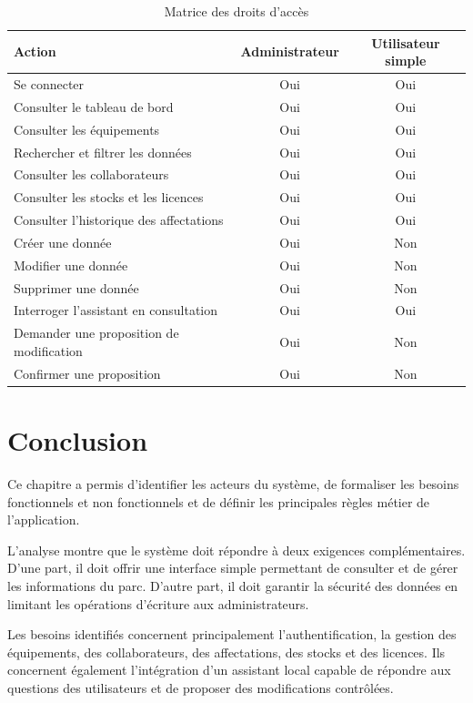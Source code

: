 \documentclass{rapportENSIAS}
\begin{document}
\begin{table}[htbp]
\centering
\caption{Matrice des droits d'accès}
\label{tab:droits-acces}
\begin{tabular}{|p{7cm}|c|c|}
\hline
\textbf{Action} & \textbf{Administrateur} & \textbf{Utilisateur simple} \\
\hline
Se connecter & Oui & Oui \\
\hline
Consulter le tableau de bord & Oui & Oui \\
\hline
Consulter les équipements & Oui & Oui \\
\hline
Rechercher et filtrer les données & Oui & Oui \\
\hline
Consulter les collaborateurs & Oui & Oui \\
\hline
Consulter les stocks et les licences & Oui & Oui \\
\hline
Consulter l'historique des affectations & Oui & Oui \\
\hline
Créer une donnée & Oui & Non \\
\hline
Modifier une donnée & Oui & Non \\
\hline
Supprimer une donnée & Oui & Non \\
\hline
Interroger l'assistant en consultation & Oui & Oui \\
\hline
Demander une proposition de modification & Oui & Non \\
\hline
Confirmer une proposition & Oui & Non \\
\hline
\end{tabular}
\end{table}

\section{Conclusion}

Ce chapitre a permis d’identifier les acteurs du système, de formaliser les besoins fonctionnels et non fonctionnels et de définir les principales règles métier de l’application.

L’analyse montre que le système doit répondre à deux exigences complémentaires. D’une part, il doit offrir une interface simple permettant de consulter et de gérer les informations du parc. D’autre part, il doit garantir la sécurité des données en limitant les opérations d’écriture aux administrateurs.

Les besoins identifiés concernent principalement l’authentification, la gestion des équipements, des collaborateurs, des affectations, des stocks et des licences. Ils concernent également l’intégration d’un assistant local capable de répondre aux questions des utilisateurs et de proposer des modifications contrôlées.
\end{document}
